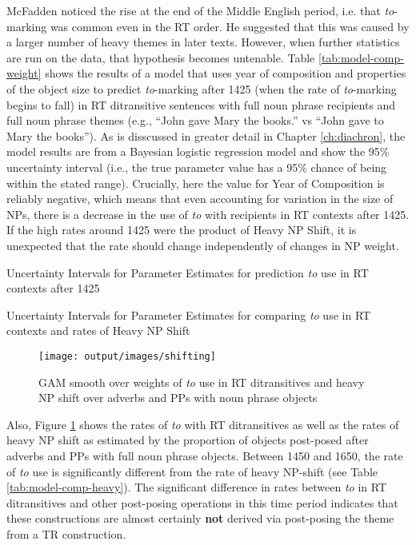 

McFadden noticed the rise at the end of the Middle English period, i.e. that \textit{to}-marking was common even in the RT order. He suggested that this was caused by a larger number of heavy themes in later texts. However, when further statistics are run on the data, that hypothesis becomes untenable. Table \ref{tab:model-comp-weight} shows the results of a model that uses year of composition and properties of the object size to predict \textit{to}-marking after 1425 (when the rate of \textit{to}-marking begins to fall) in RT ditransitive sentences with full noun phrase recipients and full noun phrase themes (e.g., ``John gave Mary the books.'' vs ``John gave to Mary the books''). As is disscussed in greater detail in Chapter \ref{ch:diachron}, the model results are from a Bayesian logistic regression model and show the 95\% uncertainty interval (i.e., the true parameter value has a 95\% chance of being within the stated range). Crucially, here the value for Year of Composition is reliably negative, which means that even accounting for variation in the size of NPs, there is a decrease in the use of \textit{to} with recipients in RT contexts after 1425. If the high rates around 1425 were the product of Heavy NP Shift, it is unexpected that the rate should change independently of changes in NP weight.

\begin{table}[ht!]
	\RawFloats
	
	\caption{Uncertainty Intervals for Parameter Estimates for prediction \textit{to} use in RT contexts after 1425}
	\label{tab:model-comp-weight}
	
	\caption{Uncertainty Intervals for Parameter Estimates for comparing \textit{to} use in RT contexts and rates of Heavy NP Shift}
	\label{tab:model-comp-heavy}
\end{table}

\begin{figure}[t!]
	\texttt{[image: output/images/shifting]}
	\caption{GAM smooth over weights of \textit{to} use in RT ditransitives and heavy NP shift over adverbs and PPs with noun phrase objects}
	\label{fig:shifting}
\end{figure}

Also, Figure \ref{fig:shifting} shows the rates of \textit{to} with RT ditransitives as well as the rates of heavy NP shift as estimated by the proportion of objects post-posed after adverbs and PPs with full noun phrase objects. Between 1450 and 1650, the rate of \textit{to} use is significantly different from the rate of heavy NP-shift (see Table \ref{tab:model-comp-heavy}). The significant difference in rates between \textit{to} in RT ditransitives and other post-posing operations in this time period indicates that these constructions are almost certainly \textbf{not} derived via post-posing the theme from a TR construction.

